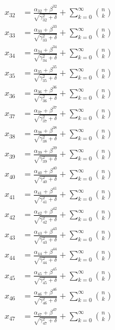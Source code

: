 \documentclass{article}
\begin{document}
\begin{align}
  x_{32} &= \frac{\alpha_{32} + \beta^{32}}{\sqrt{\gamma_{32}^2 + \delta}} + \sum_{k=0}^{\infty} \binom{n}{k} \label{eq:32} \\
  x_{33} &= \frac{\alpha_{33} + \beta^{33}}{\sqrt{\gamma_{33}^2 + \delta}} + \sum_{k=0}^{\infty} \binom{n}{k} \label{eq:33} \\
  x_{34} &= \frac{\alpha_{34} + \beta^{34}}{\sqrt{\gamma_{34}^2 + \delta}} + \sum_{k=0}^{\infty} \binom{n}{k} \label{eq:34} \\
  x_{35} &= \frac{\alpha_{35} + \beta^{35}}{\sqrt{\gamma_{35}^2 + \delta}} + \sum_{k=0}^{\infty} \binom{n}{k} \label{eq:35} \\
  x_{36} &= \frac{\alpha_{36} + \beta^{36}}{\sqrt{\gamma_{36}^2 + \delta}} + \sum_{k=0}^{\infty} \binom{n}{k} \label{eq:36} \\
  x_{37} &= \frac{\alpha_{37} + \beta^{37}}{\sqrt{\gamma_{37}^2 + \delta}} + \sum_{k=0}^{\infty} \binom{n}{k} \label{eq:37} \\
  x_{38} &= \frac{\alpha_{38} + \beta^{38}}{\sqrt{\gamma_{38}^2 + \delta}} + \sum_{k=0}^{\infty} \binom{n}{k} \label{eq:38} \\
  x_{39} &= \frac{\alpha_{39} + \beta^{39}}{\sqrt{\gamma_{39}^2 + \delta}} + \sum_{k=0}^{\infty} \binom{n}{k} \label{eq:39} \\
  x_{40} &= \frac{\alpha_{40} + \beta^{40}}{\sqrt{\gamma_{40}^2 + \delta}} + \sum_{k=0}^{\infty} \binom{n}{k} \label{eq:40} \\
  x_{41} &= \frac{\alpha_{41} + \beta^{41}}{\sqrt{\gamma_{41}^2 + \delta}} + \sum_{k=0}^{\infty} \binom{n}{k} \label{eq:41} \\
  x_{42} &= \frac{\alpha_{42} + \beta^{42}}{\sqrt{\gamma_{42}^2 + \delta}} + \sum_{k=0}^{\infty} \binom{n}{k} \label{eq:42} \\
  x_{43} &= \frac{\alpha_{43} + \beta^{43}}{\sqrt{\gamma_{43}^2 + \delta}} + \sum_{k=0}^{\infty} \binom{n}{k} \label{eq:43} \\
  x_{44} &= \frac{\alpha_{44} + \beta^{44}}{\sqrt{\gamma_{44}^2 + \delta}} + \sum_{k=0}^{\infty} \binom{n}{k} \label{eq:44} \\
  x_{45} &= \frac{\alpha_{45} + \beta^{45}}{\sqrt{\gamma_{45}^2 + \delta}} + \sum_{k=0}^{\infty} \binom{n}{k} \label{eq:45} \\
  x_{46} &= \frac{\alpha_{46} + \beta^{46}}{\sqrt{\gamma_{46}^2 + \delta}} + \sum_{k=0}^{\infty} \binom{n}{k} \label{eq:46} \\
  x_{47} &= \frac{\alpha_{47} + \beta^{47}}{\sqrt{\gamma_{47}^2 + \delta}} + \sum_{k=0}^{\infty} \binom{n}{k} \label{eq:47} \\

\end{align}
\end{document}
